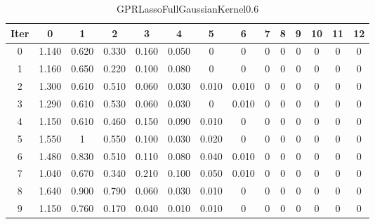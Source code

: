 \begin{table}
	\begin{center}
		\begin{tabular}{|c|c|c|c|c|c|c|c|c|c|c|c|c|c|}
			\hline
			Iter & 0 & 1 & 2 & 3 & 4 & 5 & 6 & 7 & 8 & 9 & 10 & 11 & 12 \\
			\hline
			0 & 1.140 & 0.620 & 0.330 & 0.160 & 0.050 & 0 & 0 & 0 & 0 & 0 & 0 & 0 & 0 \\
			\hline
			1 & 1.160 & 0.650 & 0.220 & 0.100 & 0.080 & 0 & 0 & 0 & 0 & 0 & 0 & 0 & 0 \\
			\hline
			2 & 1.300 & 0.610 & 0.510 & 0.060 & 0.030 & 0.010 & 0.010 & 0 & 0 & 0 & 0 & 0 & 0 \\
			\hline
			3 & 1.290 & 0.610 & 0.530 & 0.060 & 0.030 & 0 & 0.010 & 0 & 0 & 0 & 0 & 0 & 0 \\
			\hline
			4 & 1.150 & 0.610 & 0.460 & 0.150 & 0.090 & 0.010 & 0 & 0 & 0 & 0 & 0 & 0 & 0 \\
			\hline
			5 & 1.550 & 1 & 0.550 & 0.100 & 0.030 & 0.020 & 0 & 0 & 0 & 0 & 0 & 0 & 0 \\
			\hline
			6 & 1.480 & 0.830 & 0.510 & 0.110 & 0.080 & 0.040 & 0.010 & 0 & 0 & 0 & 0 & 0 & 0 \\
			\hline
			7 & 1.040 & 0.670 & 0.340 & 0.210 & 0.100 & 0.050 & 0.010 & 0 & 0 & 0 & 0 & 0 & 0 \\
			\hline
			8 & 1.640 & 0.900 & 0.790 & 0.060 & 0.030 & 0.010 & 0 & 0 & 0 & 0 & 0 & 0 & 0 \\
			\hline
			9 & 1.150 & 0.760 & 0.170 & 0.040 & 0.010 & 0.010 & 0 & 0 & 0 & 0 & 0 & 0 & 0 \\
			\hline
		\end{tabular}
	\end{center}
	\caption{GPRLassoFullGaussianKernel0.6}
\end{table}